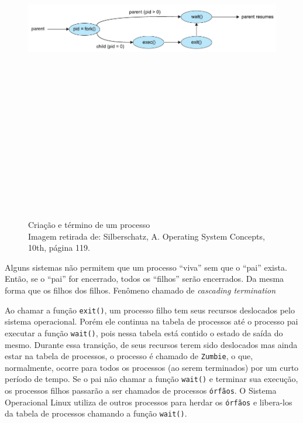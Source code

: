 \begin{figure}[h!]
\centering
\includegraphics[keepaspectratio, width=15cm, height=17cm]{imagens/05/05 - Process Creation.png}
\caption{Criação e término de um processo   \\
Imagem retirada de: Silberschatz, A. Operating System Concepts, 10th,
página 119. \\}
\label{fig:Criação e término de um processo}
\end{figure}


Alguns sistemas não permitem que um processo ``viva'' sem que o ``pai''
exista. Então, se o ``pai'' for encerrado, todos os ``filhos'' serão
encerrados. Da mesma forma que os filhos dos filhos. Fenômeno chamado de
\emph{cascading termination}

Ao chamar a função \texttt{exit()}, um processo filho tem seus recursos
deslocados pelo sistema operacional. Porém ele continua na tabela de
processos até o processo pai executar a função \texttt{wait()}, pois
nessa tabela está contido o estado de saída do mesmo. Durante essa
transição, de seus recursos terem sido deslocados mas ainda estar na
tabela de processos, o processo é chamado de \texttt{Zumbie}, o que,
normalmente, ocorre para todos os processos (ao serem terminados) por um
curto período de tempo. Se o pai não chamar a função \texttt{wait()} e
terminar sua execução, os processos filhos passarão a ser chamados de
processos \texttt{órfãos}. O Sistema Operacional Linux utiliza de outros
processos para herdar os \texttt{órfãos} e libera-los da tabela de
processos chamando a função \texttt{wait()}.

